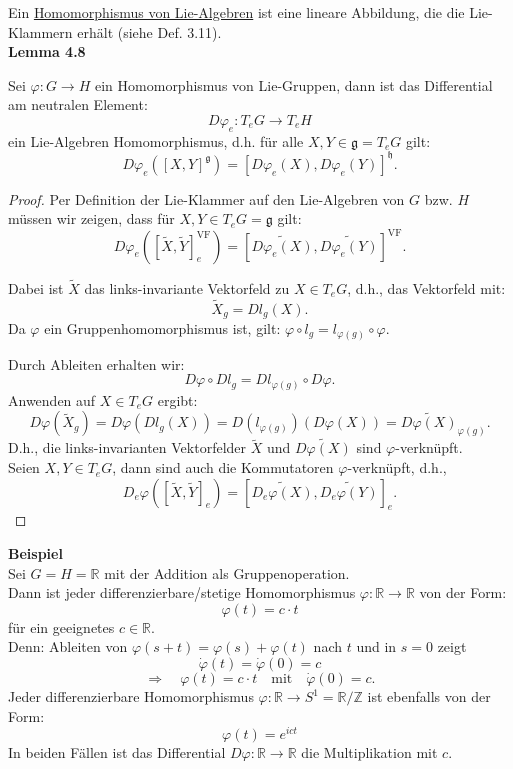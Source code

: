 \documentclass[fleqn, 12pt, letterpaper]{article}
\begin{document}
Ein {\underline{Homomorphismus von Lie-Algebren}} ist eine lineare Abbildung, die die Lie-Klammern erhält (siehe Def. 3.11).\\

\textbf{Lemma 4.8}

Sei \( \varphi: G \rightarrow H \) ein Homomorphismus von Lie-Gruppen, dann ist das Differential am neutralen Element:
\[
D\varphi_e: T_e G \rightarrow T_e H
\]
ein Lie-Algebren Homomorphismus, d.h. für alle \( X, Y \in \mathfrak{g} = T_e G \) gilt:
\[
D\varphi_e([X, Y]^{\mathfrak{g}}) = [D\varphi_e(X), D\varphi_e(Y)]^\mathfrak{h}.
\]
\begin{proof}
\quad

    Per Definition der Lie-Klammer auf den Lie-Algebren von \( G \) bzw. \( H \) müssen wir zeigen, dass für \( X, Y \in T_e G = \mathfrak{g} \) gilt:
\[
D\varphi_e([\tilde{X}, \tilde{Y}]_e^{\mathrm{VF}}) = [\widetilde{D\varphi_e(X)}, \widetilde{D\varphi_e(Y)}]^{\mathrm{VF}}.
\]

Dabei ist \( \tilde{X} \) das links-invariante Vektorfeld zu \( X \in T_e G \), d.h., das Vektorfeld mit:
\[
\tilde{X}_g = Dl_g(X).
\]
Da \( \varphi \) ein Gruppenhomomorphismus ist, gilt:
\(
\varphi \circ l_g = l_{\varphi(g)} \circ \varphi. \quad 
\)

Durch Ableiten erhalten wir:
\[
D\varphi \circ Dl_g = Dl_{\varphi(g)} \circ D\varphi.
\]
Anwenden auf \( X \in T_e G \) ergibt:
\[
D\varphi(\tilde{X}_g) = D\varphi(Dl_g(X)) = D(l_{\varphi(g)})(D\varphi(X))=\widetilde{D\varphi(X)}_{\varphi(g)}.
\]
D.h., die links-invarianten Vektorfelder \( \tilde{X} \) und \( \widetilde{D\varphi(X)} \) sind \( \varphi \)-verknüpft. \\

Seien \( X, Y \in T_e G \), dann sind auch die Kommutatoren \( \varphi \)-verknüpft, d.h.,
\[
D_e \varphi([\tilde{X}, \tilde{Y}]_e) = [\widetilde{D_e \varphi({X})}, \widetilde{D_e \varphi({Y})}]_e.
\]
\end{proof}

\textbf{Beispiel}\\
Sei \( G = H = \mathbb{R} \) mit der Addition als Gruppenoperation. \\
Dann ist jeder differenzierbare/stetige Homomorphismus \( \varphi: \mathbb{R} \rightarrow \mathbb{R} \) von der Form:
\[
\varphi(t) = c \cdot t
\]
für ein geeignetes \( c \in \mathbb{R} \). \\
Denn: Ableiten von 
\(
\varphi(s + t) = \varphi(s) + \varphi(t)
\)
nach \( t \) und in \( s = 0 \) zeigt
\[
\dot{\varphi}(t) = \dot{\varphi}(0) = c
\]
\[
\Rightarrow \quad \varphi(t) = c \cdot t \quad \text{mit} \quad \dot{\varphi}(0) = c.
\]
Jeder differenzierbare Homomorphismus \( \varphi: \mathbb{R} \rightarrow S^1 = \mathbb{R}/\mathbb{Z} \) ist ebenfalls von der Form:
\[
\varphi(t) = e^{ict}
\]
In beiden Fällen ist das Differential \( D\varphi: \mathbb{R} \rightarrow \mathbb{R} \) die Multiplikation mit \( c \).\\
\end{document}
